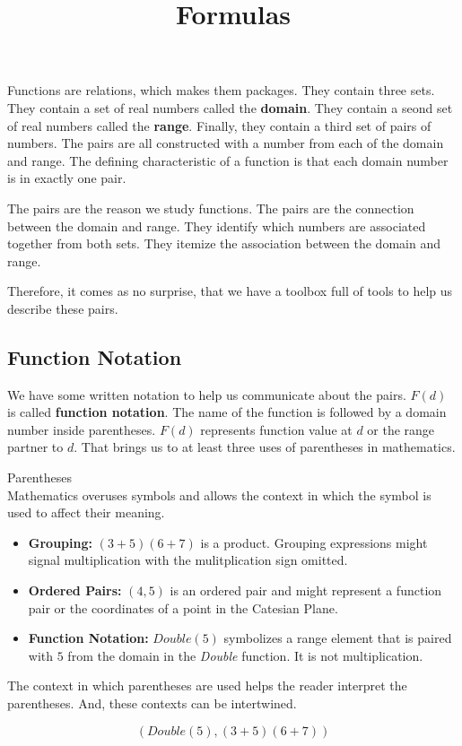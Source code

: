 \documentclass{ximera}
\title{Formulas}
\begin{document}
\begin{abstract}

\end{abstract}
\maketitle


Functions are relations, which makes them packages.  They contain three sets.  They contain a set of real numbers called the \textbf{domain}.  They contain a seond set of real numbers called the \textbf{range}. Finally, they contain a third set of pairs of numbers.  The pairs are all constructed with a number from each of the domain and range. The defining characteristic of a function is that each domain number is in exactly one pair.

The pairs are the reason we study functions.  The pairs are the connection between the domain and range.  They identify which numbers are associated together from both sets. They itemize the association between the domain and range.

Therefore, it comes as no surprise, that we have a toolbox full of tools to help us describe these pairs.


\subsection{Function Notation}

We have some written notation to help us communicate about the pairs.  $F(d)$ is called \textbf{function notation}. The name of the function is followed by a domain number inside parentheses. $F(d)$ represents function value at $d$ or the range partner to $d$.  That brings us to at least three uses of parentheses in mathematics.

\begin{notation}  Parentheses \\

Mathematics overuses symbols and allows the context in which the symbol is used to affect their meaning.
	\begin{itemize}
		\item \textbf{Grouping:} $(3+5)(6+7)$ is a product.  Grouping expressions might signal multiplication with the mulitplication sign omitted.
		\item \textbf{Ordered Pairs:} $(4, 5)$ is an ordered pair and might represent a function pair or the coordinates of a point in the Catesian Plane.
		\item \textbf{Function Notation:} $Double(5)$ symbolizes a range element that is paired with $5$ from the domain in the \textit{Double} function. It is not multiplication.
	\end{itemize}


The context in which parentheses are used helps the reader interpret the parentheses.  And, these contexts can be intertwined.

\[  (Double(5), (3+5)(6+7))    \]
\end{notation}
\end{document}
